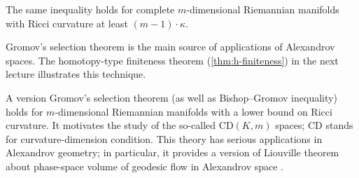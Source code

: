 The same inequality holds for complete $m$-dimensional Riemannian manifolds with Ricci curvature at least $(m-1)\cdot \kappa$.

Gromov's selection theorem is the main source of applications of Alexandrov spaces.
The homotopy-type finiteness theorem (\ref{thm:h-finiteness}) in the next lecture illustrates this technique.

A version Gromov's selection theorem (as well as Bishop--Gromov inequality) holds for $m$-dimensional Riemannian manifolds with a lower bound on Ricci curvature.
It motivates the study of the so-called $\mathrm{CD}(K,m)$ spaces; $\mathrm{CD}$ stands for curvature-dimension condition.
This theory has serious applications in Alexandrov geometry;
in particular, it provides a version of Liouville theorem about phase-space volume of geodesic flow in Alexandrov space \cite{brue-mondino-semola}.
